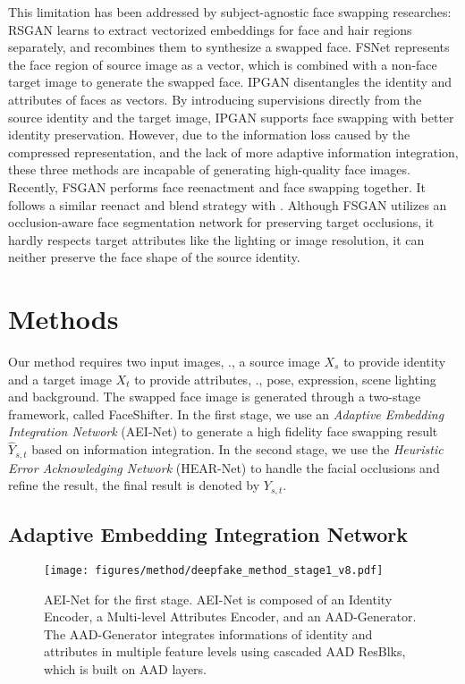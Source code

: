 This limitation has been addressed by subject-agnostic face swapping researches: 
RSGAN \cite{natsume2018rsgan} learns to extract vectorized embeddings for face and hair regions separately, and recombines them to synthesize a swapped face.
FSNet \cite{natsume2018fsnet} represents the face region of source image as a vector, which is combined with a non-face target image to generate the swapped face. 
IPGAN \cite{Bao_ipgan} disentangles the identity and attributes of faces as vectors. By introducing supervisions directly from the source identity and the target image, IPGAN supports face swapping with better identity preservation. However, due to the information loss caused by the compressed representation, and the lack of more adaptive information integration, these three methods are incapable of generating high-quality face images. Recently, FSGAN \cite{nirkin2019fsgan} performs face reenactment and face swapping together. It follows a similar reenact and blend strategy with \cite{olszewski2017realistic,nagano2018pagan}. Although FSGAN utilizes an occlusion-aware face segmentation network for preserving target occlusions, it hardly respects target attributes like the lighting or image resolution, it can neither preserve the face shape of the source identity.

\section{Methods}

Our method requires two input images, \ie., a source image ${X}_s$ to provide identity and a target image ${X}_t$ to provide attributes, \eg., pose, expression, scene lighting and background. The swapped face image is generated through a two-stage framework, called FaceShifter. In the first stage, we use an \emph{Adaptive Embedding Integration Network} (AEI-Net) to generate a high fidelity face swapping result $\hat{Y}_{s,t}$ based on information integration. In the second stage, we use the \emph{Heuristic Error Acknowledging Network} (HEAR-Net) to handle the facial occlusions and refine the result, the final result is denoted by $Y_{s,t}$. 

\subsection{Adaptive Embedding Integration Network}
\label{sec: stage_I}

\begin{figure*}[t]
\centering
 \texttt{[image: figures/method/deepfake\_method\_stage1\_v8.pdf]}
 \footnotesize
    \caption{AEI-Net for the first stage. AEI-Net is composed of an Identity Encoder, a Multi-level Attributes Encoder, and an AAD-Generator. The AAD-Generator integrates informations of identity and attributes in multiple feature levels using cascaded AAD ResBlks, which is built on AAD layers.}
\label{fig:framework_stage1}
\vspace{-1em}
\end{figure*}


